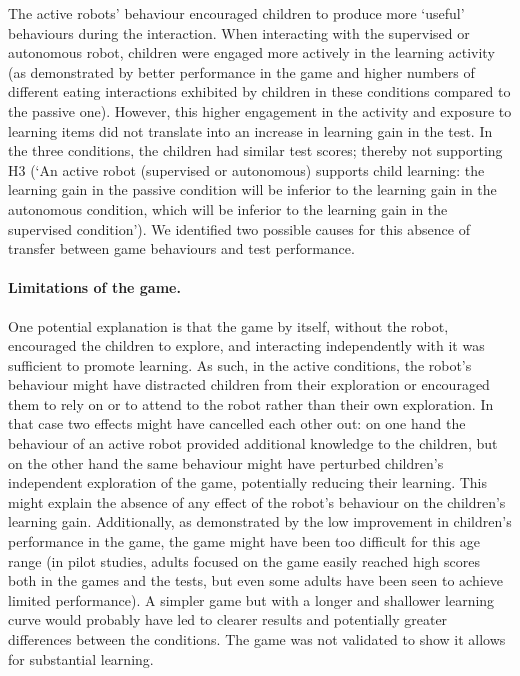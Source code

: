 The active robots' behaviour encouraged children to produce more `useful' behaviours during the interaction. When interacting with the supervised or autonomous robot, children were engaged more actively in the learning activity (as demonstrated by better performance in the game and higher numbers of different eating interactions exhibited by children in these conditions compared to the passive one). However, this higher engagement in the activity and exposure to learning items did not translate into an increase in learning gain in the test. In the three conditions, the children had similar test scores; thereby not supporting H3 (`An active robot (supervised or autonomous) supports child learning: the learning gain in the passive condition will be inferior to the learning gain in the autonomous condition, which will be inferior to the learning gain in the supervised condition'). We identified two possible causes for this absence of transfer between game behaviours and test performance. 

\paragraph{Limitations of the game.} 
One potential explanation is that the game by itself, without the robot, encouraged the children to explore, and interacting independently with it was sufficient to promote learning. As such, in the active conditions, the robot's behaviour might have distracted children from their exploration or encouraged them to rely on or to attend to the robot rather than their own exploration. In that case two effects might have cancelled each other out: on one hand the behaviour of an active robot provided additional knowledge to the children, but on the other hand the same behaviour might have perturbed children's independent exploration of the game, potentially reducing their learning. This might explain the absence of any effect of the robot's behaviour on the children's learning gain. Additionally, as demonstrated by the low improvement in children's performance in the game, the game might have been too difficult for this age range (in pilot studies, adults focused on the game easily reached high scores both in the games and the tests, but even some adults have been seen to achieve limited performance). A simpler game but with a longer and shallower learning curve would probably have led to clearer results and potentially greater differences between the conditions. The game was not validated to show it allows for substantial learning.

